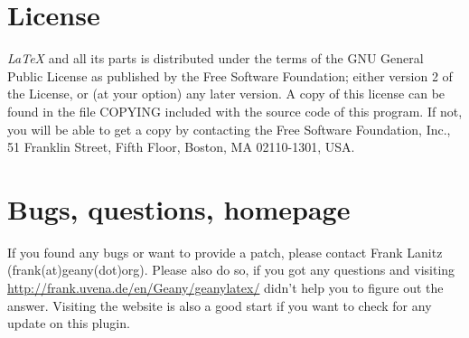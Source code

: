 \documentclass[%
paper=a4,%
fontsize=11pt,%
twoside=false,%
DIV18,%
headsepline,%
plainheadsepline,%
footsepline,%
plainfootsepline,%
bibliography=totoc,%
listof=totoc,%
BCOR10mm,%
parskip=half,%
openany,%
]{scrartcl}
\begin{document}
\section{License}
\textit{LaTeX} and all its parts is distributed under the terms of the
GNU General Public License as published by the Free Software
Foundation; either version 2 of the License, or (at your option) any
later version. A copy of this license can be found in the file COPYING
included with the source code of this program. If not, you will be
able to get a copy by contacting the Free Software Foundation, Inc.,
51 Franklin Street, Fifth Floor, Boston, MA 02110-1301, USA.


\section{Bugs, questions, homepage}
\label{contact}
If you found any bugs or want to provide a patch, please contact Frank
Lanitz (frank(at)geany(dot)org). Please also do so, if you got any
questions and visiting \\ \url{http://frank.uvena.de/en/Geany/geanylatex/}
didn't help you to figure out the answer. Visiting the website is also
a good start if you want to check for any update on this plugin.
\end{document}
